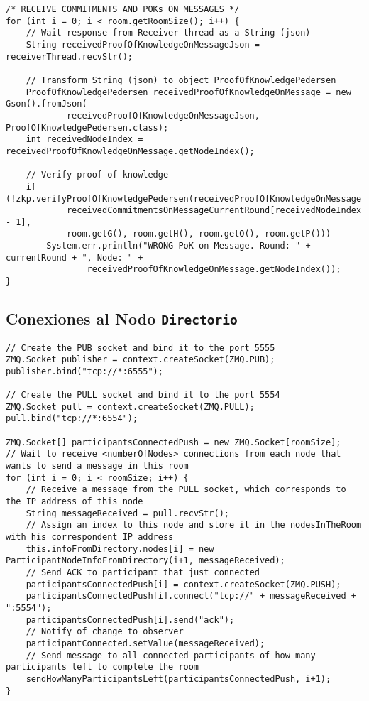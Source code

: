 \begin{verbatim}
/* RECEIVE COMMITMENTS AND POKs ON MESSAGES */
for (int i = 0; i < room.getRoomSize(); i++) {
    // Wait response from Receiver thread as a String (json)
    String receivedProofOfKnowledgeOnMessageJson = receiverThread.recvStr();

    // Transform String (json) to object ProofOfKnowledgePedersen
    ProofOfKnowledgePedersen receivedProofOfKnowledgeOnMessage = new Gson().fromJson(
            receivedProofOfKnowledgeOnMessageJson, ProofOfKnowledgePedersen.class);
    int receivedNodeIndex = receivedProofOfKnowledgeOnMessage.getNodeIndex();

    // Verify proof of knowledge
    if (!zkp.verifyProofOfKnowledgePedersen(receivedProofOfKnowledgeOnMessage,
            receivedCommitmentsOnMessageCurrentRound[receivedNodeIndex - 1],
            room.getG(), room.getH(), room.getQ(), room.getP()))
        System.err.println("WRONG PoK on Message. Round: " + currentRound + ", Node: " +
                receivedProofOfKnowledgeOnMessage.getNodeIndex());
}
\end{verbatim}

\subsection{Conexiones al Nodo \texttt{Directorio}}

\begin{verbatim}
// Create the PUB socket and bind it to the port 5555
ZMQ.Socket publisher = context.createSocket(ZMQ.PUB);
publisher.bind("tcp://*:6555");

// Create the PULL socket and bind it to the port 5554
ZMQ.Socket pull = context.createSocket(ZMQ.PULL);
pull.bind("tcp://*:6554");

ZMQ.Socket[] participantsConnectedPush = new ZMQ.Socket[roomSize];
// Wait to receive <numberOfNodes> connections from each node that wants to send a message in this room
for (int i = 0; i < roomSize; i++) {
    // Receive a message from the PULL socket, which corresponds to the IP address of this node
    String messageReceived = pull.recvStr();
    // Assign an index to this node and store it in the nodesInTheRoom with his correspondent IP address
    this.infoFromDirectory.nodes[i] = new ParticipantNodeInfoFromDirectory(i+1, messageReceived);
    // Send ACK to participant that just connected
    participantsConnectedPush[i] = context.createSocket(ZMQ.PUSH);
    participantsConnectedPush[i].connect("tcp://" + messageReceived + ":5554");
    participantsConnectedPush[i].send("ack");
    // Notify of change to observer
    participantConnected.setValue(messageReceived);
    // Send message to all connected participants of how many participants left to complete the room
    sendHowManyParticipantsLeft(participantsConnectedPush, i+1);
}
\end{verbatim}
